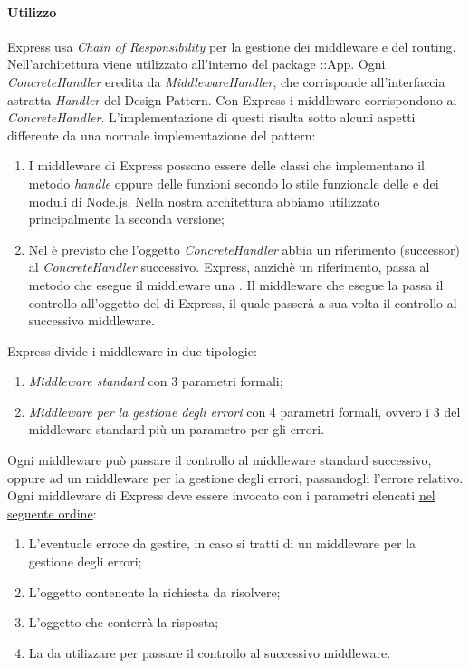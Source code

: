 \paragraph{Utilizzo}
Express usa \textit{Chain of Responsibility} per la gestione dei middleware e del routing. Nell'architettura viene utilizzato all'interno del package ::App. Ogni \textit{ConcreteHandler} eredita da \textit{MiddlewareHandler}, che corrisponde all'interfaccia astratta \textit{Handler} del Design Pattern.
Con Express i middleware corrispondono ai \textit{ConcreteHandler}. L'implementazione di questi risulta sotto alcuni aspetti differente da una normale implementazione del pattern:
\begin{enumerate}
\item I middleware di Express possono essere delle classi che implementano il metodo \textit{handle} oppure delle funzioni secondo lo stile funzionale delle  e dei moduli di Node.js. Nella nostra architettura abbiamo utilizzato principalmente la seconda versione;
\item Nel  è previsto che l'oggetto \textit{ConcreteHandler} abbia un riferimento (successor) al \textit{ConcreteHandler} successivo. Express, anzichè un riferimento, passa al metodo che esegue il middleware una . Il middleware che esegue la  passa il controllo all'oggetto del  di Express, il quale passerà a sua volta il controllo al successivo middleware.
\end{enumerate}
Express divide i middleware in due tipologie:
\begin{enumerate}
\item \textit{Middleware standard} con 3 parametri formali;
\item \textit{Middleware per la gestione degli errori} con 4 parametri formali, ovvero i 3 del middleware standard più un parametro per gli errori.
\end{enumerate}
Ogni middleware può passare il controllo al middleware standard successivo, oppure ad un middleware per la gestione degli errori, passandogli l'errore relativo.
Ogni middleware di Express deve essere invocato con i parametri  elencati \uline{nel seguente ordine}:
\begin{enumerate}
\item L'eventuale errore da gestire, in caso si tratti di un middleware per la gestione degli errori;
\item L'oggetto contenente la richiesta da risolvere;
\item L'oggetto che conterrà la risposta;
\item La  da utilizzare per passare il controllo al successivo middleware.
\end{enumerate}
